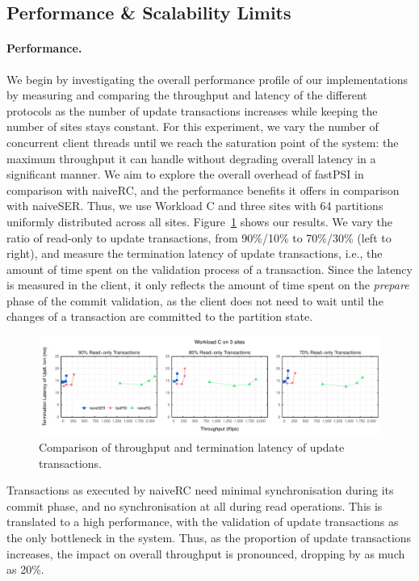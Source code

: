 \subsection{Performance \& Scalability Limits}

\paragraph{Performance.} We begin by investigating the overall performance profile of our implementations by measuring and comparing the throughput and latency of the different protocols as the number of update transactions increases while keeping the number of sites stays constant. For this experiment, we vary the number of concurrent client threads until we reach the saturation point of the system: the maximum throughput it can handle without degrading overall latency in a significant manner. We aim to explore the overall overhead of fastPSI in comparison with naiveRC, and the performance benefits it offers in comparison with naiveSER. Thus, we use Workload C and three sites with 64 partitions uniformly distributed across all sites. Figure~\ref{fig:general_bench} shows our results. We vary the ratio of read-only to update transactions, from 90\%/10\% to 70\%/30\% (left to right), and measure the termination latency of update transactions, i.e., the amount of time spent on the validation process of a transaction. Since the latency is measured in the client, it only reflects the amount of time spent on the \emph{prepare} phase of the commit validation, as the client does not need to wait until the changes of a transaction are committed to the partition state.

\begin{figure}[t]
\vspace{-0.5cm}
\includegraphics[width=\textwidth]{figures/general_bench.pdf}
\vspace{-1cm}
\caption{Comparison of throughput and termination latency of update transactions.}
\label{fig:general_bench}
\end{figure}

Transactions as executed by naiveRC need minimal synchronisation during its commit phase, and no synchronisation at all during read operations. This is translated to a high performance, with the validation of update transactions as the only bottleneck in the system. Thus, as the proportion of update transactions increases, the impact on overall throughput is pronounced, dropping by as much as 20\%.

